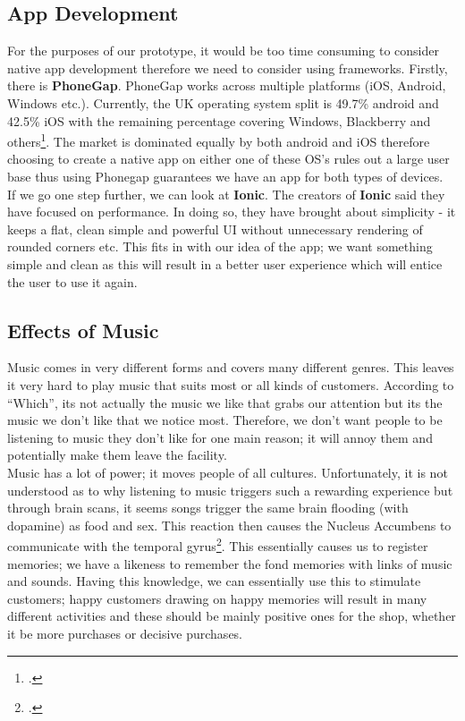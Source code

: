 \subsection{App Development}
For the purposes of our prototype, it would be too time consuming to consider native app development therefore we need to consider using frameworks.  Firstly, there is \textbf{PhoneGap}.  PhoneGap works across multiple platforms (iOS, Android, Windows etc.).  Currently, the UK operating system split is 49.7\% android and 42.5\% iOS with the remaining percentage covering Windows, Blackberry and others\footcite{market-share}.  The market is dominated equally by both android and iOS therefore choosing to create a native app on either one of these OS's rules out a large user base thus using Phonegap guarantees we have an app for both types of devices.  \\
If we go one step further, we can look at \textbf{Ionic}.  The creators of \textbf{Ionic} said they have focused on performance.  In doing so, they have brought about simplicity - it keeps a flat, clean simple and powerful UI without unnecessary rendering of rounded corners etc.  This fits in with our idea of the app; we want something simple and clean as this will result in a better user experience which will entice the user to use it again.  

\subsection{Effects of Music}
Music comes in very different forms and covers many different genres.  This leaves it very hard to play music that suits most or all kinds of customers.  According to ``Which'', its not actually the music we like that grabs our attention but its the music we don't like that we notice most.   Therefore, we don't want people to be listening to music they don't like for one main reason; it will annoy them and potentially make them leave the facility.  \\

Music has a lot of power; it moves people of all cultures.  Unfortunately, it is not understood as to why listening to music triggers such a rewarding experience but through brain scans, it seems songs trigger the same brain flooding (with dopamine) as food and sex.  This reaction then causes the Nucleus Accumbens to communicate with the temporal gyrus\footcite{love-music}.  This essentially causes us to register memories; we have a likeness to remember the fond memories with links of music and sounds.  Having this knowledge, we can essentially use this to stimulate customers; happy customers drawing on happy memories will result in many different activities and these should be mainly positive ones for the shop, whether it be more purchases or decisive purchases.  \\


